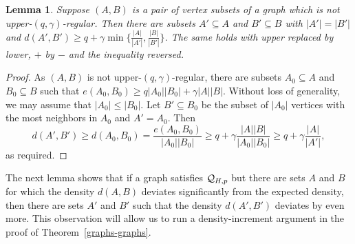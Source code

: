 \documentclass[11pt]{article}
\newtheorem{lemma}{Lemma}[section]
\begin{document}
\begin{lemma}\label{lowup}
Suppose $(A,B)$ is a pair of vertex subsets of a graph which is not upper-$(q,\gamma)$-regular. Then there are subsets $A' \subseteq A$ and $B' \subseteq B$ with $|A'|=|B'|$ and $d(A',B') \geq  q+\gamma\min\{\frac{|A|}{|A'|}, \frac{|B|}{|B'|}\}$. The same holds with upper replaced by lower, $+$ by $-$ and the inequality reversed. 
\end{lemma}

\begin{proof}
As $(A,B)$ is not upper-$(q,\gamma)$-regular, there are subsets $A_0 \subseteq A$ and $B_0 \subseteq B$ such that 
$e(A_0,B_0) \geq q|A_0||B_0|+\gamma|A||B|$. Without loss of generality, we may assume that $|A_0| \leq |B_0|$. Let $B' \subseteq B_0$ be the subset of $|A_0|$ vertices with the most neighbors in $A_0$ and $A'=A_0$. Then 
$$d(A',B') \geq d(A_0,B_0) = \frac{e(A_0,B_0)}{|A_0||B_0|} \geq q+\gamma\frac{|A||B|}{|A_0||B_0|} \geq q+\gamma\frac{|A|}{|A'|},$$
as required. 
\end{proof}

The next lemma shows that if a graph satisfies ${\cal Q}_{H,p}$ but there are sets $A$ and $B$ for which the density $d(A, B)$ deviates significantly from the expected density, then there are sets $A'$ and $B'$ such that the density $d(A', B')$ deviates by even more. This observation will allow us to run a density-increment argument in the proof of Theorem~\ref{graphs-graphs}.
\end{document}
